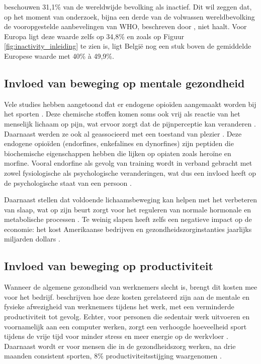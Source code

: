 \textcite{Hallal2012} beschouwen 31,1\% van de wereldwijde bevolking als inactief. Dit wil zeggen dat, op het moment van onderzoek, bijna een derde van de volwassen wereldbevolking de vooropgestelde aanbevelingen van WHO, beschreven door \textcite{Bull2020}, niet haalt. Voor Europa ligt deze waarde zelfs op 34,8\% en zoals op Figuur \ref{fig:inactivity_inleiding} te zien is, ligt België nog een stuk boven de gemiddelde Europese waarde met 40\% à 49,9\%.

\subsection{Invloed van beweging op mentale gezondheid}
Vele studies hebben aangetoond dat er endogene opioïden aangemaakt worden bij het sporten \autocite{Harber1984}. Deze chemische stoffen komen soms ook vrij als reactie van het menselijk lichaam op pijn, wat ervoor zorgt dat de pijnperceptie kan veranderen \autocite{Chaudhry2023, Dishman2009}. Daarnaast werden ze ook al geassocieerd met een toestand van plezier \autocite{Chaudhry2023}.
Deze endogene opioïden (endorfines, enkefalines en dynorfines) zijn peptiden die biochemische eigenschappen hebben die lijken op opiaten zoals heroïne en morfine. Vooral endorfine als gevolg van training wordt in verband gebracht met zowel fysiologische als psychologische veranderingen, wat dus een invloed heeft op de psychologische staat van een persoon \autocite{Dishman2009}.

Daarnaast stellen \textcite{Mahindru2023} dat voldoende lichaamsbeweging kan helpen met het verbeteren van slaap, wat op zijn beurt zorgt voor het reguleren van normale hormonale en metabolische processen \autocite{Dolezal2017}. Te weinig slapen heeft zelfs een negatieve impact op de economie: het kost Amerikaanse bedrijven en gezondheidszorginstanties jaarlijks miljarden dollars \autocite{Dolezal2017}.


\subsection{Invloed van beweging op productiviteit}
Wanneer de algemene gezondheid van werknemers slecht is, brengt dit kosten mee voor het bedrijf. \textcite{Sjoegaard2016} beschrijven hoe deze kosten gerelateerd zijn aan de mentale en fysieke afwezigheid van werknemers tijdens het werk, met een verminderde productiviteit tot gevolg. Echter, voor personen die sedentair werk uitvoeren en voornamelijk aan een computer werken, zorgt een verhoogde hoeveelheid sport tijdens de vrije tijd voor minder stress en meer energie op de werkvloer \autocite{Hansen2009}. Daarnaast wordt er voor mensen die in de gezondheidszorg werken, na drie maanden consistent sporten, 8\% productiviteitsstijging waargenomen \autocite{Sjoegaard2016}.

